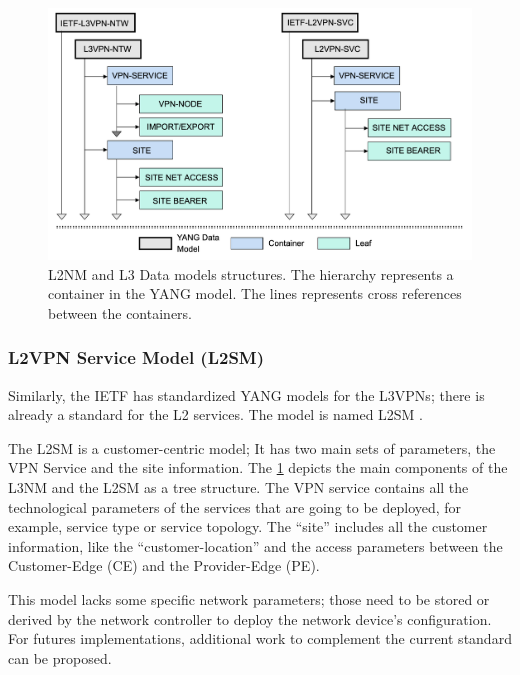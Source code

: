 \documentclass[10pt, conference]{IEEEtran}
\begin{document}
\begin{figure}
	\centering
	\includegraphics[width=\linewidth]{figs/diagram-10.png}
	\caption{L2NM and L3 Data models structures. The hierarchy represents a container in the YANG model. The  lines represents cross references between the containers.}
	\label{FIG:l3nm} 
\end{figure}

\subsubsection{L2VPN Service Model (L2SM)}
\label{section:l2nm}

Similarly, the IETF has standardized YANG models for the L3VPNs; there is already a standard for the L2 services. The model is named L2SM \cite{wen2018yang}. 

The L2SM is a customer-centric model; It has two main sets of parameters, the VPN Service and the site information. The \cref{FIG:l3nm} depicts the main components of the L3NM and the L2SM as a tree structure. The VPN service contains all the technological parameters of the services that are going to be deployed, for example, service type or service topology. The ``site'' includes all the customer information, like the ``customer-location'' and the access parameters between the Customer-Edge (CE) and the Provider-Edge (PE).

This model lacks some specific network parameters; those need to be stored or derived by the network controller to deploy the network device's configuration. For futures implementations, additional work to complement the current standard can be proposed.  
\end{document}
